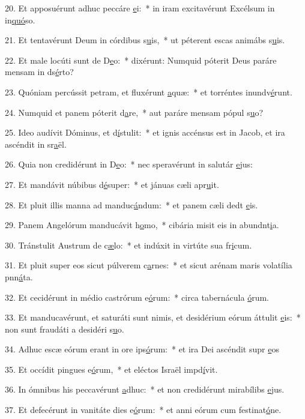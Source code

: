 20. Et apposuérunt adhuc peccáre \uline{e}i:~* in iram excitavérunt Excélsum in in\uline{quó}so.\par 
21. Et tentavérunt Deum in córdibus s\uline{u}is,~* ut péterent escas animábs s\uline{u}is.\par 
22. Et male locúti sunt de D\uline{e}o:~* dixérunt: Numquid póterit Deus paráre mensam in ds\uline{é}rto?\par 
23. Quóniam percússit petram, et fluxérunt \uline{a}quæ:~* et torréntes inundv\uline{é}runt.\par 
24. Numquid et panem póterit d\uline{a}re,~* aut paráre mensam pópul s\uline{u}o?\par 
25. Ideo audívit Dóminus, et d\uline{í}stulit:~* et ignis accénsus est in Jacob, et ira ascéndit in sr\uline{a}ël.\par 
26. Quia non credidérunt in D\uline{e}o:~* nec speravérunt in salutár \uline{e}jus:\par 
27. Et mandávit núbibus d\uline{é}super:~* et jánuas cæli apr\uline{u}it.\par 
28. Et pluit illis manna ad manduc\uline{á}ndum:~* et panem cæli dedt \uline{e}is.\par 
29. Panem Angelórum manducávit h\uline{o}mo,~* cibária misit eis in abundnt\uline{i}a.\par 
30. Tránstulit Austrum de c\uline{æ}lo:~* et indúxit in virtúte sua fr\uline{i}cum.\par 
31. Et pluit super eos sicut púlverem c\uline{a}rnes:~* et sicut arénam maris volatília pnn\uline{á}ta.\par 
32. Et cecidérunt in médio castrórum e\uline{ó}rum:~* circa tabernácula \uline{ó}rum.\par 
33. Et manducavérunt, et saturáti sunt nimis, et desidérium eórum áttulit \uline{e}is:~* non sunt fraudáti a desidéri s\uline{u}o.\par 
34. Adhuc escæ eórum erant in ore ips\uline{ó}rum:~* et ira Dei ascéndit supr \uline{e}os\par 
35. Et occídit pingues e\uline{ó}rum,~* et eléctos Israël impd\uline{í}vit.\par 
36. In ómnibus his peccavérunt \uline{a}dhuc:~* et non credidérunt mirabílibs \uline{e}jus.\par 
37. Et defecérunt in vanitáte dies e\uline{ó}rum:~* et anni eórum cum festinat\uline{ó}ne.\par 
